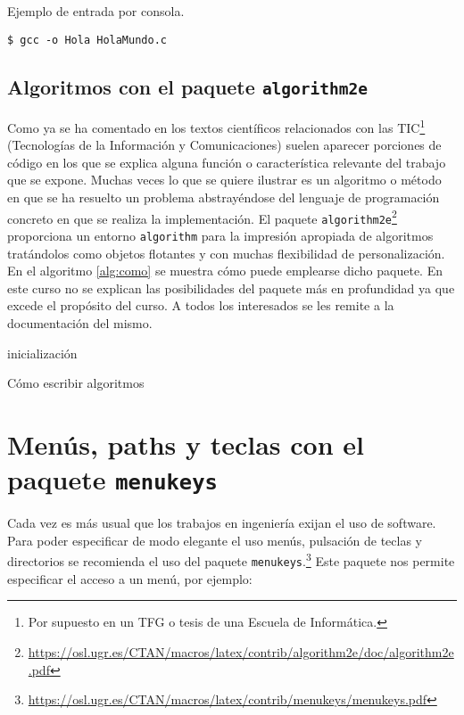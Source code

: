 \noindent Ejemplo de entrada por consola.

\begin{lstlisting}[style=consola, numbers=none]
$ gcc -o Hola HolaMundo.c
\end{lstlisting}


\subsection{Algoritmos con el paquete \texttt{algorithm2e}}
Como ya se ha comentado en los textos científicos relacionados con las TIC\footnote{Por supuesto en un TFG o tesis de una Escuela de Informática.} (Tecnologías de la Información y Comunicaciones) suelen aparecer porciones de código en los que se explica alguna función o característica relevante del trabajo que se expone. Muchas veces lo que se quiere ilustrar es un algoritmo o método en que se ha resuelto un problema abstrayéndose del lenguaje de programación concreto en que se realiza la implementación. El paquete \texttt{algorithm2e}\footnote{\url{https://osl.ugr.es/CTAN/macros/latex/contrib/algorithm2e/doc/algorithm2e.pdf}} proporciona un entorno \texttt{algorithm} para la impresión apropiada de algoritmos tratándolos como objetos flotantes y con muchas flexibilidad de personalización. En el algoritmo \ref{alg:como} se muestra cómo puede emplearse dicho paquete. En este curso no se explican las posibilidades del paquete más en profundidad ya que excede el propósito del curso. A todos los interesados se les remite a la documentación del mismo.


\IncMargin{1em}
\begin{algorithm}
\LinesNumbered
\SetAlgoLined


inicialización\;

\caption{Cómo escribir algoritmos}\label{alg:como}
\end{algorithm}\DecMargin{1em}

\newpage

\section{Menús, paths y teclas con el paquete \texttt{menukeys}}
Cada vez es más usual que los trabajos en ingeniería exijan el uso de software. Para poder especificar de modo elegante el uso menús, pulsación de teclas y directorios se recomienda el uso del paquete \texttt{menukeys}.\footnote{\url{https://osl.ugr.es/CTAN/macros/latex/contrib/menukeys/menukeys.pdf}} Este paquete nos permite especificar el acceso a un menú, por ejemplo:

